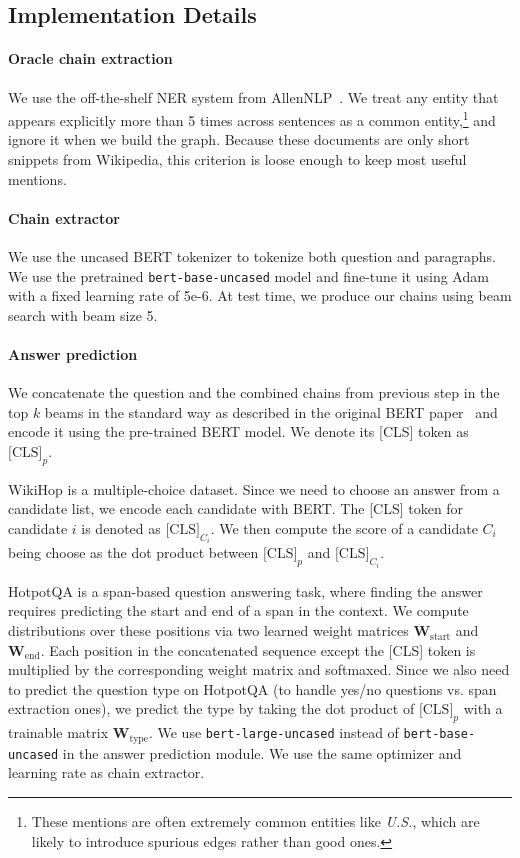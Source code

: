 \documentclass[11pt,a4paper]{article}
\begin{document}
\subsection{Implementation Details}
\paragraph{Oracle chain extraction}We use the off-the-shelf NER system from AllenNLP~\citep{Gardner2017AllenNLP}. We treat any entity that appears explicitly more than 5 times across sentences as a common entity,\footnote{These mentions are often extremely common entities like \emph{U.S.}, which are likely to introduce spurious edges rather than good ones.} and ignore it when we build the graph. Because these documents are only short snippets from Wikipedia, this criterion is loose enough to keep most useful mentions.

\paragraph{Chain extractor}We use the uncased BERT tokenizer to tokenize both question and paragraphs. We use the pretrained \texttt{bert-base-uncased} model and fine-tune it using Adam with a fixed learning rate of 5e-6. At test time, we produce our chains using beam search with beam size 5.  

\paragraph{Answer prediction} We concatenate the question and the combined chains from previous step in the top $k$ beams in the standard way as described in the original BERT paper~\cite{devlin2018bert} and encode it using the pre-trained BERT model. We denote its [CLS] token as $\textrm{[CLS]}_p$.

WikiHop is a multiple-choice dataset. Since we need to choose an answer from a candidate list, we encode each candidate with BERT. The [CLS] token for candidate $i$ is denoted as $\textrm{[CLS]}_{C_i}$. We then compute the score of a candidate $C_i$ being choose as the dot product between $\textrm{[CLS]}_p$ and $\textrm{[CLS]}_{C_i}$.

HotpotQA is a span-based question answering task, where finding the answer requires predicting the start and end of a span in the context. We compute distributions over these positions via two learned weight matrices $\mathbf{W}_\textrm{start}$ and $\mathbf{W}_\textrm{end}$. Each position in the concatenated sequence except the [CLS] token is multiplied by the corresponding weight matrix and softmaxed. Since we also need to predict the question type on HotpotQA (to handle yes/no questions vs. span extraction ones), we predict the type by taking the dot product of $\textrm{[CLS]}_p$ with a trainable matrix $\mathbf{W}_\textrm{type}$. We use \texttt{bert-large-uncased} instead of \texttt{bert-base-uncased} in the answer prediction module. We use the same optimizer and learning rate as chain extractor.
\end{document}
